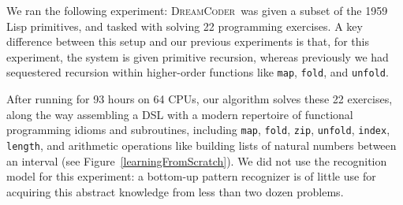 \documentclass{article}
\newcommand{\system}{\textsc{DreamCoder}~}
\newcommand{\code}[1]{{\footnotesize\texttt{#1}}}
\begin{document}
We ran the following experiment: \system was given a subset of
the 1959 Lisp primitives, and tasked with solving 22
programming exercises. A key difference between
this setup and our previous experiments is that,
for this experiment,
the system is
given primitive recursion,
whereas previously we had sequestered recursion within
higher-order functions like \code{map}, \code{fold}, and \code{unfold}.

After running for 93 hours on 64 CPUs, our
algorithm solves these 22 exercises, along the way assembling a DSL
with a modern repertoire of
functional programming idioms and subroutines, including \code{map},
\code{fold}, \code{zip}, \code{unfold}, \code{index}, \code{length},
and  arithmetic operations like 
building lists of natural numbers between an interval (see Figure~\ref{learningFromScratch}).
We did not use the recognition model for this experiment:
a bottom-up pattern recognizer is of little use
for acquiring this abstract knowledge
from less than two dozen problems.
\end{document}
